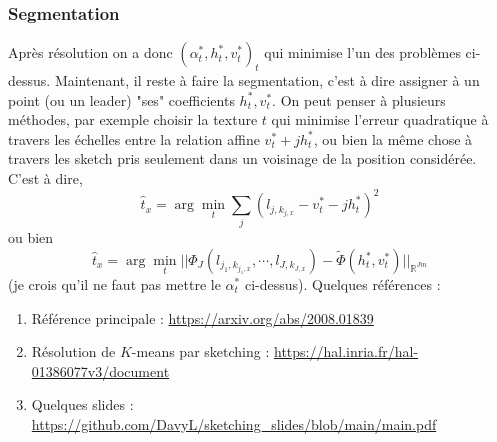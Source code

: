 \documentclass[11pt]{article} %
\begin{document}
\subsubsection{Segmentation}
Après résolution on a donc $(\alpha_t^*,h_t^*, v_t^*)_t$ qui minimise l'un des problèmes ci-dessus. Maintenant, il reste à faire la segmentation, c'est à dire assigner à un point (ou un leader) "ses" coefficients $h_t^*, v_t^*$. On peut penser à plusieurs méthodes, par exemple choisir la texture $t$ qui minimise l'erreur quadratique à travers les échelles entre la relation affine $v_t^* + jh_t^*$, ou bien la même chose à travers les sketch pris seulement dans un voisinage de la position considérée. C'est à dire,
\begin{equation}
	\hat{t}_x = \arg\min_t \sum_j (l_{j,k_{j,x}} - v_t^* - jh_t^*)^2
\end{equation}
ou bien
\begin{equation}
	\hat{t}_x = \arg\min_t ||\Phi_J(l_{j_1,k_{j_1,x}}, \cdots, l_{J,k_{J,x}} ) - \tilde\Phi(h_t^*,v_t^*)||_{\mathbb{R}^{Jm}}
\end{equation}
(je crois qu'il ne faut pas mettre le $\alpha_t^*$ ci-dessus).
\newline
Quelques références :
\begin{enumerate}
	\item Référence principale : \url{https://arxiv.org/abs/2008.01839}
	\item Résolution de $K$-means par sketching : \url{https://hal.inria.fr/hal-01386077v3/document}
	\item Quelques slides : \url{https://github.com/DavyL/sketching_slides/blob/main/main.pdf}
\end{enumerate}
\end{document}
